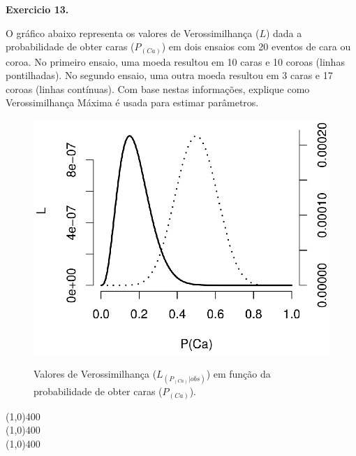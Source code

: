 \begin{refsection}
\begin{blackBlock}{\textbf{Exercicio 13.}}\label{tut12:ex:13.2}

O gráfico abaixo representa os valores de Verossimilhança ($L$) dada a probabilidade de obter caras ($P_{(Ca)}$) em dois ensaios com 20 eventos de cara ou coroa. No primeiro ensaio, uma moeda resultou em 10 caras e 10 coroas (linhas pontilhadas). No segundo ensaio, uma outra moeda resultou em 3 caras e 17 coroas (linhas contínuas). Com base nestas informações, explique como Verossimilhança Máxima é usada para estimar parâmetros.

\end{blackBlock}

  \begin{figure}[h!]
       \centering
      {\includegraphics[scale=0.8]{figures/tut12/plot_coins.eps}}
      {\caption{Valores de Verossimilhança ($L_{(P_{(Ca)}|obs)}$) em função da probabilidade de obter caras ($P_{(Ca)}$).}\label{fig:plot_coin}}
  \end{figure}



\begin{center}
\line(1,0){400}\\
\line(1,0){400}\\
\line(1,0){400}\\
\end{center}




\end{refsection}
